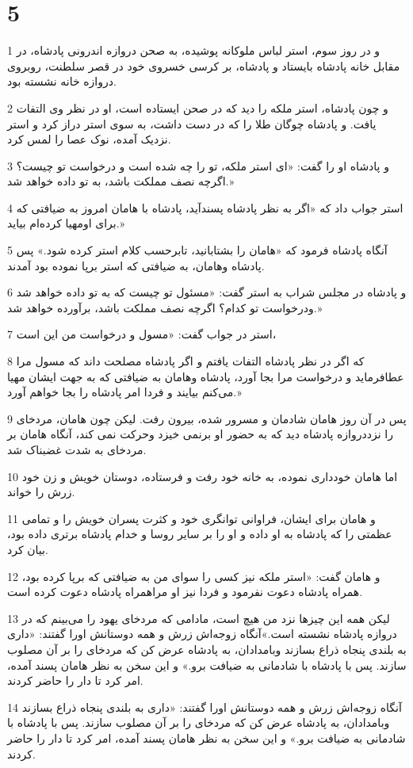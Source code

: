 \chapter{5}

\par 1 و در روز سوم، استر لباس ملوکانه پوشیده، به صحن دروازه اندرونی پادشاه، در مقابل خانه پادشاه بایستاد و پادشاه، بر کرسی خسروی خود در قصر سلطنت، روبروی دروازه خانه نشسته بود.
\par 2 و چون پادشاه، استر ملکه را دید که در صحن ایستاده است، او در نظر وی التفات یافت. و پادشاه چوگان طلا را که در دست داشت، به سوی استر دراز کرد و استر نزدیک آمده، نوک عصا را لمس کرد.
\par 3 و پادشاه او را گفت: «ای استر ملکه، تو را چه شده است و درخواست تو چیست؟ اگر‌چه نصف مملکت باشد، به تو داده خواهد شد.»
\par 4 استر جواب داد که «اگر به نظر پادشاه پسندآید، پادشاه با هامان امروز به ضیافتی که برای اومهیا کرده‌ام بیاید.»
\par 5 آنگاه پادشاه فرمود که «هامان را بشتابانید، تابرحسب کلام استر کرده شود.» پس پادشاه وهامان، به ضیافتی که استر برپا نموده بود آمدند.
\par 6 و پادشاه در مجلس شراب به استر گفت: «مسئول تو چیست که به تو داده خواهد شد ودرخواست تو کدام؟ اگرچه نصف مملکت باشد، برآورده خواهد شد.»
\par 7 استر در جواب گفت: «مسول و درخواست من این است،
\par 8 که اگر در نظر پادشاه التفات یافتم و اگر پادشاه مصلحت داند که مسول مرا عطافرماید و درخواست مرا بجا آورد، پادشاه وهامان به ضیافتی که به جهت ایشان مهیا می‌کنم بیایند و فردا امر پادشاه را بجا خواهم آورد.»
\par 9 پس در آن روز هامان شادمان و مسرور شده، بیرون رفت. لیکن چون هامان، مردخای را نزددروازه پادشاه دید که به حضور او برنمی خیزد وحرکت نمی کند، آنگاه هامان بر مردخای به شدت غضبناک شد.
\par 10 اما هامان خودداری نموده، به خانه خود رفت و فرستاده، دوستان خویش و زن خود زرش را خواند.
\par 11 و هامان برای ایشان، فراوانی توانگری خود و کثرت پسران خویش را و تمامی عظمتی را که پادشاه به او داده و او را بر سایر روسا و خدام پادشاه برتری داده بود، بیان کرد.
\par 12 و هامان گفت: «استر ملکه نیز کسی را سوای من به ضیافتی که برپا کرده بود، همراه پادشاه دعوت نفرمود و فردا نیز او مراهمراه پادشاه دعوت کرده است.
\par 13 لیکن همه این چیزها نزد من هیچ است، مادامی که مردخای یهود را می‌بینم که در دروازه پادشاه نشسته است.»آنگاه زوجه‌اش زرش و همه دوستانش اورا گفتند: «داری به بلندی پنجاه ذراع بسازند وبامدادان، به پادشاه عرض کن که مردخای را بر آن مصلوب سازند. پس با پادشاه با شادمانی به ضیافت برو.» و این سخن به نظر هامان پسند آمده، امر کرد تا دار را حاضر کردند.
\par 14 آنگاه زوجه‌اش زرش و همه دوستانش اورا گفتند: «داری به بلندی پنجاه ذراع بسازند وبامدادان، به پادشاه عرض کن که مردخای را بر آن مصلوب سازند. پس با پادشاه با شادمانی به ضیافت برو.» و این سخن به نظر هامان پسند آمده، امر کرد تا دار را حاضر کردند.
 

